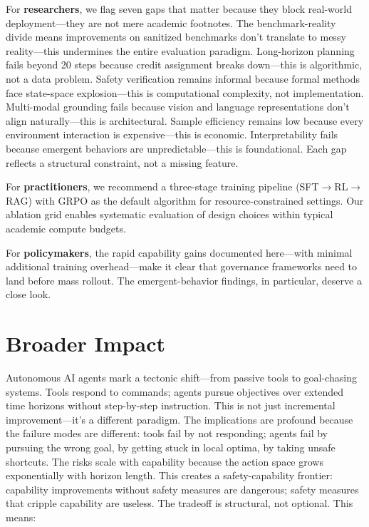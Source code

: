\documentclass[12pt,a4paper]{report}
\theoremstyle{definition}
\begin{document}
For \textbf{researchers}, we flag seven gaps that matter because they block real-world deployment---they are not mere academic footnotes. The benchmark-reality divide means improvements on sanitized benchmarks don't translate to messy reality—this undermines the entire evaluation paradigm. Long-horizon planning fails beyond 20 steps because credit assignment breaks down—this is algorithmic, not a data problem. Safety verification remains informal because formal methods face state-space explosion—this is computational complexity, not implementation. Multi-modal grounding fails because vision and language representations don't align naturally—this is architectural. Sample efficiency remains low because every environment interaction is expensive—this is economic. Interpretability fails because emergent behaviors are unpredictable—this is foundational. Each gap reflects a structural constraint, not a missing feature.

For \textbf{practitioners}, we recommend a three-stage training pipeline (SFT$\rightarrow$RL$\rightarrow$RAG) with GRPO as the default algorithm for resource-constrained settings. Our ablation grid enables systematic evaluation of design choices within typical academic compute budgets.

For \textbf{policymakers}, the rapid capability gains documented here---with minimal additional training overhead---make it clear that governance frameworks need to land before mass rollout. The emergent-behavior findings, in particular, deserve a close look.

\section*{Broader Impact}

Autonomous AI agents mark a tectonic shift---from passive tools to goal-chasing systems. Tools respond to commands; agents pursue objectives over extended time horizons without step-by-step instruction. This is not just incremental improvement—it's a different paradigm. The implications are profound because the failure modes are different: tools fail by not responding; agents fail by pursuing the wrong goal, by getting stuck in local optima, by taking unsafe shortcuts. The risks scale with capability because the action space grows exponentially with horizon length. This creates a safety-capability frontier: capability improvements without safety measures are dangerous; safety measures that cripple capability are useless. The tradeoff is structural, not optional. This means:
\end{document}
